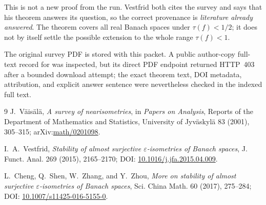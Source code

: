 \documentclass[11pt]{article}
\begin{document}
This is not a new proof from the run.  Vestfrid both cites the survey and says
that his theorem answers its question, so the correct provenance is
\emph{literature already answered}.  The theorem covers all real Banach
spaces under $\tau(f)<1/2$; it does not by itself settle the possible extension
to the whole range $\tau(f)<1$.

The original survey PDF is stored with this packet.  A public author-copy
full-text record for \cite{Vestfrid} was inspected, but its direct PDF endpoint
returned HTTP~403 after a bounded download attempt; the exact theorem text,
DOI metadata, attribution, and explicit answer sentence were nevertheless
checked in the indexed full text.

\begin{thebibliography}{9}
J.~V\"ais\"al\"a,
\emph{A survey of nearisometries},
in \emph{Papers on Analysis}, Reports of the Department of Mathematics and
Statistics, University of Jyv\"askyl\"a 83 (2001), 305--315;
arXiv:\href{https://arxiv.org/abs/math/0201098}{math/0201098}.

I.~A.~Vestfrid,
\emph{Stability of almost surjective $\varepsilon$-isometries of Banach
spaces},
J. Funct. Anal. 269 (2015), 2165--2170;
DOI: \href{https://doi.org/10.1016/j.jfa.2015.04.009}%
{10.1016/j.jfa.2015.04.009}.

L.~Cheng, Q.~Shen, W.~Zhang, and Y.~Zhou,
\emph{More on stability of almost surjective $\varepsilon$-isometries of
Banach spaces},
Sci. China Math. 60 (2017), 275--284;
DOI: \href{https://doi.org/10.1007/s11425-016-5155-0}%
{10.1007/s11425-016-5155-0}.
\end{thebibliography}
\end{document}

